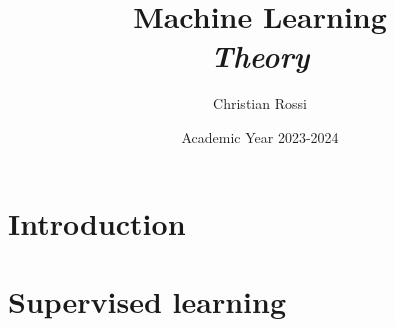 \documentclass[12pt, a4paper]{report}
\title{Machine Learning \\ \textit{Theory}}
\author{Christian Rossi}
\date{Academic Year 2023-2024}
\begin{document}
    \maketitle

    

    \cleardoublepage 

    \tableofcontents

    \cleardoublepage

    \chapter{Introduction}
    

    \chapter{Supervised learning}
    
    
\end{document}
